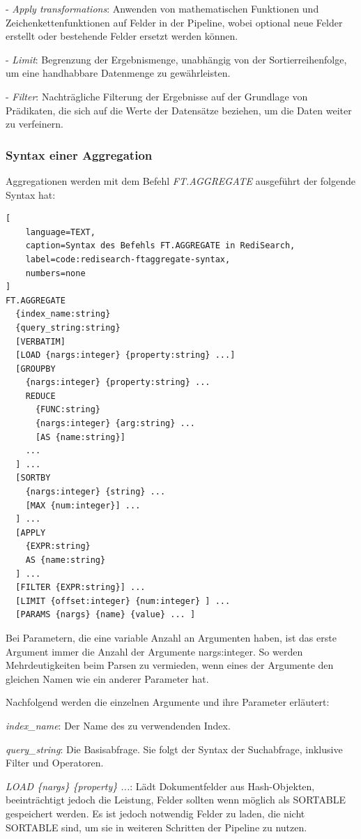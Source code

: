 - \emph{Apply transformations}: Anwenden von mathematischen Funktionen und Zeichenkettenfunktionen auf Felder in der Pipeline, wobei optional neue Felder erstellt oder bestehende Felder ersetzt werden können.
    
- \emph{Limit}: Begrenzung der Ergebnismenge, unabhängig von der Sortierreihenfolge, um eine handhabbare Datenmenge zu gewährleisten.
    
- \emph{Filter}: Nachträgliche Filterung der Ergebnisse auf der Grundlage von Prädikaten, die sich auf die Werte der Datensätze beziehen, um die Daten weiter zu verfeinern.

\subsubsection{Syntax einer Aggregation}
Aggregationen werden mit dem Befehl \emph{FT.AGGREGATE} ausgeführt der folgende Syntax hat:
\begin{lstlisting}[
    language=TEXT,
    caption=Syntax des Befehls FT.AGGREGATE in RediSearch,
    label=code:redisearch-ftaggregate-syntax,
    numbers=none
]
FT.AGGREGATE
  {index_name:string}
  {query_string:string}
  [VERBATIM]
  [LOAD {nargs:integer} {property:string} ...]
  [GROUPBY
    {nargs:integer} {property:string} ...
    REDUCE
      {FUNC:string}
      {nargs:integer} {arg:string} ...
      [AS {name:string}]
    ...
  ] ...
  [SORTBY
    {nargs:integer} {string} ...
    [MAX {num:integer}] ...
  ] ...
  [APPLY
    {EXPR:string}
    AS {name:string}
  ] ...
  [FILTER {EXPR:string}] ...
  [LIMIT {offset:integer} {num:integer} ] ...
  [PARAMS {nargs} {name} {value} ... ]
\end{lstlisting}

Bei Parametern, die eine variable Anzahl an Argumenten haben, ist das erste Argument immer die Anzahl der Argumente {nargs:integer}. So werden Mehrdeutigkeiten beim Parsen zu vermieden, wenn eines der Argumente den gleichen Namen wie ein anderer Parameter hat.

Nachfolgend werden die einzelnen Argumente und ihre Parameter erläutert:

\emph{index\_name}: Der Name des zu verwendenden Index.

\emph{query\_string}: Die Basisabfrage. Sie folgt der Syntax der Suchabfrage, inklusive Filter und Operatoren.

\emph{LOAD \{nargs\} \{property\} ...}: Lädt Dokumentfelder aus Hash-Objekten, beeinträchtigt jedoch die Leistung, Felder sollten wenn möglich als SORTABLE gespeichert werden. Es ist jedoch notwendig Felder zu laden, die nicht SORTABLE sind, um sie in weiteren Schritten der Pipeline zu nutzen.

